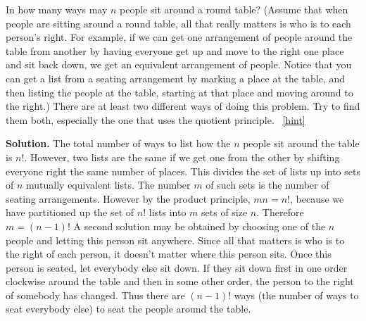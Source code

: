 \documentclass{book}
\begin{document}
\setcounter{project}{110}
\addtocounter{project}{-1}
\begin{activity}[]\label{roundtable}
\hypertarget{p-802}{}%
In how many ways may \(n\) people sit around a round table? (Assume that when people are sitting around a round table, all that really matters is who is to each person's right. For example, if we can get one arrangement of people around the table from another by having everyone get up and move to the right one place and sit back down, we get an equivalent arrangement of people. Notice that you can get a list from a seating arrangement by marking a place at the table, and then listing the people at the table, starting at that place and moving around to the right.) There are at least two different ways of doing this problem. Try to find them both, especially the one that uses the quotient principle.%
~\hfill{\tiny\hyperlink{a-110}{[hint]}\hypertarget{q-110}{}}\par\smallskip%
\noindent\textbf{Solution.}\hypertarget{solution-83}{}\quad%
\hypertarget{p-805}{}%
The total number of ways to list how the \(n\) people sit around the table is \(n!\). However, two lists are the same if we get one from the other by shifting everyone right the same number of places. This divides the set of lists up into sets of \(n\) mutually equivalent lists. The number \(m\) of such sets is the number of seating arrangements. However by the product principle, \(mn=n!\), because we have partitioned up the set of \(n!\) lists into \(m\) sets of size \(n\). Therefore \(m=(n-1)!\) A second solution may be obtained by choosing one of the \(n\) people and letting this person sit anywhere. Since all that matters is who is to the right of each person, it doesn't matter where this person sits. Once this person is seated, let everybody else sit down. If they sit down first in one order clockwise around the table and then in some other order, the person to the right of somebody has changed. Thus there are \((n-1)!\) ways (the number of ways to seat everybody else) to seat the people around the table.%
\end{activity}
\end{document}
